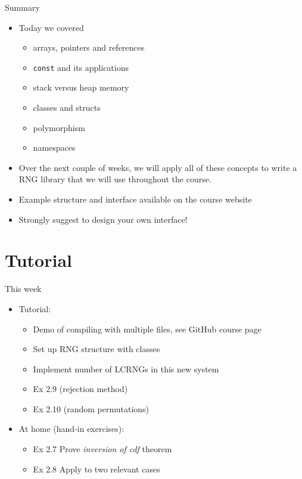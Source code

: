 \documentclass[10pt]{beamer}
\begin{document}
\begin{frame}[fragile,label={sec:orgfa07146}]{Summary}
 \begin{itemize}
\item Today we covered
\begin{itemize}
\item arrays, pointers and references
\item \texttt{const} and its applications
\item stack versus heap memory
\item classes and structs
\item polymorphism
\item namespaces
\end{itemize}
\item Over the next couple of weeks, we will apply all of these concepts to write a RNG library that we
will use throughout the course.
\item Example structure and interface available on the course website
\item Strongly suggest to design your own interface!
\end{itemize}
\end{frame}
\section{Tutorial}
\label{sec:org912c618}
\begin{frame}[label={sec:orga757dfd}]{This week}
\begin{itemize}
\item Tutorial:
\begin{itemize}
\item Demo of compiling with multiple files, see GitHub course page
\item Set up RNG structure with classes
\item Implement number of LCRNGs in this new system
\item \alert{Ex 2.9} (rejection method)
\item \alert{Ex 2.10} (random permutations)
\end{itemize}
\item At home (hand-in exercises):
\begin{itemize}
\item \alert{\alert{Ex 2.7}} Prove \emph{inversion of cdf} theorem
\item \alert{\alert{Ex 2.8}} Apply to two relevant cases
\end{itemize}
\end{itemize}
\end{frame}
\end{document}
